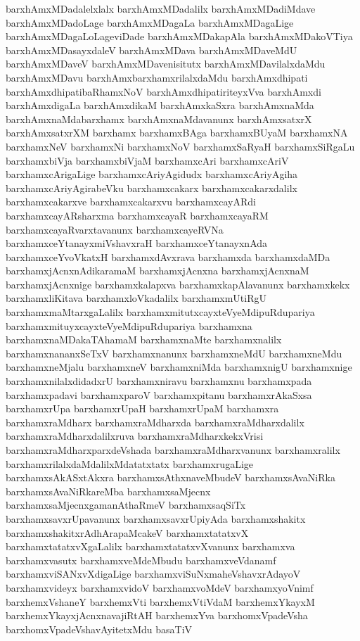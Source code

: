 {barxhAmxMDadalelxlalx
barxhAmxMDadalilx
barxhAmxMDadiMdave
barxhAmxMDadoLage
barxhAmxMDagaLa
barxhAmxMDagaLige
barxhAmxMDagaLoLageviDade
barxhAmxMDakapAla
barxhAmxMDakoVTiya
barxhAmxMDasayxdaleV
barxhAmxMDava
barxhAmxMDaveMdU
barxhAmxMDaveV
barxhAmxMDavenisitutx
barxhAmxMDavilalxdaMdu
barxhAmxMDavu
barxhAmxbarxhamxrilalxdaMdu
barxhAmxdhipati
barxhAmxdhipatibaRhamxNoV
barxhAmxdhipatiriteyxVva
barxhAmxdi
barxhAmxdigaLa
barxhAmxdikaM
barxhAmxkaSxra
barxhAmxnaMda
barxhAmxnaMdabarxhamx
barxhAmxnaMdavanunx
barxhAmxsatxrX
barxhAmxsatxrXM
barxhamx
barxhamxBAga
barxhamxBUyaM
barxhamxNA
barxhamxNeV
barxhamxNi
barxhamxNoV
barxhamxSaRyaH
barxhamxSiRgaLu
barxhamxbiVja
barxhamxbiVjaM
barxhamxcAri
barxhamxcAriV
barxhamxcArigaLige
barxhamxcAriyAgidudx
barxhamxcAriyAgiha
barxhamxcAriyAgirabeVku
barxhamxcakarx
barxhamxcakarxdalilx
barxhamxcakarxve
barxhamxcakarxvu
barxhamxcayARdi
barxhamxcayARsharxma
barxhamxcayaR
barxhamxcayaRM
barxhamxcayaRvarxtavanunx
barxhamxcayeRVNa
barxhamxceYtanayxmiVshavxraH
barxhamxceYtanayxnAda
barxhamxceYvoVkatxH
barxhamxdAvxrava
barxhamxda
barxhamxdaMDa
barxhamxjAcnxnAdikaramaM
barxhamxjAcnxna
barxhamxjAcnxnaM
barxhamxjAcnxnige
barxhamxkalapxva
barxhamxkapAlavanunx
barxhamxkekx
barxhamxliKitava
barxhamxloVkadalilx
barxhamxmUtiRgU
barxhamxmaMtarxgaLalilx
barxhamxmitutxcayxteVyeMdipuRdupariya
barxhamxmituyxcayxteVyeMdipuRdupariya
barxhamxna
barxhamxnaMDakaTAhamaM
barxhamxnaMte
barxhamxnalilx
barxhamxnananxSeTxV
barxhamxnanunx
barxhamxneMdU
barxhamxneMdu
barxhamxneMjalu
barxhamxneV
barxhamxniMda
barxhamxnigU
barxhamxnige
barxhamxnilalxdidadxrU
barxhamxniravu
barxhamxnu
barxhamxpada
barxhamxpadavi
barxhamxparoV
barxhamxpitanu
barxhamxrAkaSxsa
barxhamxrUpa
barxhamxrUpaH
barxhamxrUpaM
barxhamxra
barxhamxraMdharx
barxhamxraMdharxda
barxhamxraMdharxdalilx
barxhamxraMdharxdalilxruva
barxhamxraMdharxkekxVrisi
barxhamxraMdharxparxdeVshada
barxhamxraMdharxvanunx
barxhamxralilx
barxhamxrilalxdaMdalilxMdatatxtatx
barxhamxrugaLige
barxhamxsAkASxtAkxra
barxhamxsAthxnaveMbudeV
barxhamxsAvaNiRka
barxhamxsAvaNiRkareMba
barxhamxsaMjecnx
barxhamxsaMjecnxgamanAthaRmeV
barxhamxsaqSiTx
barxhamxsavxrUpavanunx
barxhamxsavxrUpiyAda
barxhamxshakitx
barxhamxshakitxrAdhArapaMcakeV
barxhamxtatatxvX
barxhamxtatatxvXgaLalilx
barxhamxtatatxvXvanunx
barxhamxva
barxhamxvasutx
barxhamxveMdeMbudu
barxhamxveVdanamf
barxhamxviSANxvXdigaLige
barxhamxviSuNxmaheVshavxrAdayoV
barxhamxvideyx
barxhamxvidoV
barxhamxvoMdeV
barxhamxyoVnimf
barxhemxVshaneY
barxhemxVti
barxhemxVtiVdaM
barxhemxYkayxM
barxhemxYkayxjAcnxnavajiRtAH
barxhemxYva
barxhomxVpadeVsha
barxhomxVpadeVshavAyitetxMdu
basaTiV
}
